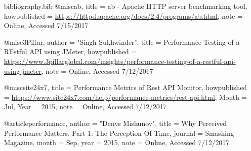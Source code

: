 \begin{filecontents}{bibliography.bib}
@misc{ab,
    title = {{ab - Apache HTTP server benchmarking tool}},
    howpublished = {\url{https://httpd.apache.org/docs/2.4/programs/ab.html}},
    note = {Online, Accessed 7/15/2017}
}

@misc{3Pillar,
    author = "{Singh Sukhwinder}",
    title = {{Performance Testing of a REstful API using JMeter}},
    howpublished = {\url{https://www.3pillarglobal.com/insights/performance-testing-of-a-restful-api-using-jmeter}},
    note = {Online, Accessed 7/12/2017}
}

@misc{site24x7,
    title = {{Performance Metrics of Rest API Monitor}},
    howpublished = {\url{https://www.site24x7.com/help/performance-metrics/rest-api.html}},
    Month = {Jul},
    Year = {2015},
    note = {Online, Accessed 7/12/2017}
}

@article{performance,
    author = "{Denys Mishunov}",
    title = {{Why Perceived Performance Matters, Part 1: The Perception Of Time}},
    journal = {Smashing Magazine},
    month = {Sep},
    year = {2015},
    note = {Online, Accessed 7/12/2017}
}

\end{filecontents}


\documentclass[10pt, conference]{IEEEtran}
\usepackage{blindtext, graphicx}
%


%
\usepackage{cite}


